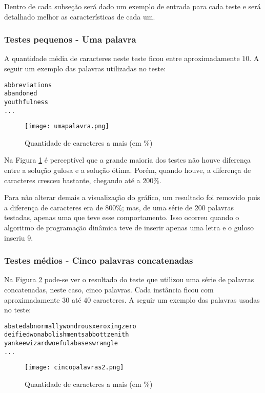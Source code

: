 \documentclass[12pt]{article}
\begin{document}
Dentro de cada subseção será dado um exemplo de entrada para cada teste e será detalhado melhor as características de cada um.

\subsubsection{Testes pequenos - Uma palavra}
\label{pequeno}

A quantidade média de caracteres neste teste ficou entre aproximadamente $10$. A seguir um exemplo das palavras utilizadas no teste:

\begin{verbatim}
abbreviations
abandoned
youthfulness
...
\end{verbatim}


    \begin{figure}[h!]
        \centering
        \texttt{[image: umapalavra.png]}
        \caption{Quantidade de caracteres a mais (em \%)}
        \label{umapalavra}
    \end{figure}

    Na Figura \ref{umapalavra} é perceptível que a grande maioria dos testes não houve diferença entre a solução gulosa e a solução ótima. Porém, quando houve, a diferença de caracteres cresceu bastante, chegando até a $200\%$.

    Para não alterar demais a visualização do gráfico, um resultado foi removido pois a diferença de caracteres era de $800\%$; mas, de uma série de 200 palavras testadas, apenas uma que teve esse comportamento. Isso ocorreu quando o algoritmo de programação dinâmica teve de inserir apenas uma letra e o guloso inseriu 9.


\subsubsection{Testes médios - Cinco palavras concatenadas}
\label{medio}

Na Figura \ref{cincopalavras} pode-se ver o resultado do teste que utilizou uma série de palavras concatenadas, neste caso, cinco palavras. Cada instância ficou com aproximadamente $30$ até $40$ caracteres. A seguir um exemplo das palavras usadas no teste:

\begin{verbatim}
abatedabnormallywondrousxeroxingzero
deifiedwonabolishmentsabbottzenith
yankeewizardwoefulabaseswrangle
...
\end{verbatim}


    \begin{figure}[h!]
        \centering
        \texttt{[image: cincopalavras2.png]}
        \caption{Quantidade de caracteres a mais (em \%)}
        \label{cincopalavras}
    \end{figure}
\end{document}
